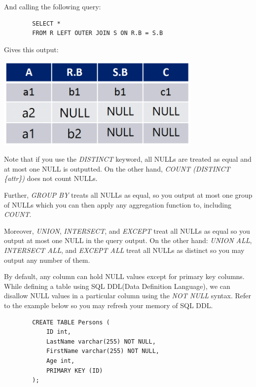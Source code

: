 \documentclass{article}
\begin{document}
And calling the following query:

\begin{tcolorbox}
    \begin{verbatim}
        SELECT *
        FROM R LEFT OUTER JOIN S ON R.B = S.B
    \end{verbatim}
\end{tcolorbox}

Gives this output:

\includegraphics[width=10cm]{Assets/leftOuterJoin.png}

Note that if you use the \textit{DISTINCT} keyword, all NULLs are treated as equal and at most one NULL is outputted. On the other hand, \textit{COUNT (DISTINCT \{attr\})} does not count NULLs.

Further, \textit{GROUP BY} treats all NULLs as equal, so you output at most one group of NULLs which you can then apply any aggregation function to, including \textit{COUNT}.

Moreover, \textit{UNION}, \textit{INTERSECT}, and \textit{EXCEPT} treat all NULLs as equal so you output at most one NULL in the query output. On the other hand: \textit{UNION ALL}, \textit{INTERSECT ALL}, and \textit{EXCEPT ALL} treat all NULLs as distinct so you may output any number of them.

By default, any column can hold NULL values except for primary key columns. While defining a table using SQL DDL(Data Definition Language), we can disallow NULL values in a particular column using the \textit{NOT NULL} syntax. Refer to the example below so you may refresh your memory of SQL DDL.

\begin{tcolorbox}
    \begin{verbatim}
        CREATE TABLE Persons (
            ID int,
            LastName varchar(255) NOT NULL,
            FirstName varchar(255) NOT NULL,
            Age int,
            PRIMARY KEY (ID)
        );
    \end{verbatim}
\end{tcolorbox}
\end{document}
